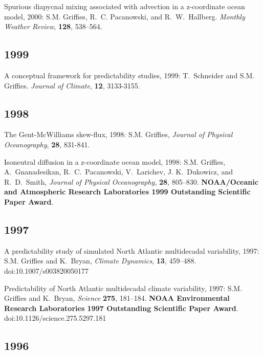 \begin{etaremune}
\item Spurious diapycnal mixing associated with advection in a z-coordinate ocean model, 2000: S.M. Grif\/f\/ies, R.\ C. Pacanowski, and R.\ W.\ Hallberg. {\em Monthly Weather Review}, {\bf 128}, 538--564.

\subsection*{\sc \color{Maroon} 1999}

\item A conceptual framework for predictability studies, 1999: T.\  Schneider and S.M. Grif\/f\/ies.  {\em Journal of Climate}, {\bf 12}, 3133-3155.

\subsection*{\sc \color{Maroon} 1998}
  
\item The Gent-McWilliams skew-flux, 1998: S.M. Grif\/f\/ies, {\em Journal of Physical Oceanography}, {\bf 28}, 831-841.
  
\item Isoneutral diffusion in a z-coordinate ocean model, 1998: S.M. Grif\/f\/ies, A.\ Gnanadesikan, R.\ C.\ Pacanowski, V.\ Larichev, J. K.\ Dukowicz, and R.\ D.\ Smith, {\em Journal of  Physical Oceanography}, {\bf 28}, 805--830.  {\bf NOAA/Oceanic and Atmospheric Research Laboratories 1999 Outstanding Scientific Paper Award}.

\subsection*{\sc \color{Maroon} 1997}
  
\item A predictability study of simulated North Atlantic multidecadal variability, 1997: S.M. Grif\/f\/ies and K.\ Bryan, {\em Climate Dynamics}, {\bf 13}, 459--488. doi:10.1007/s003820050177
  
\item Predictability of North Atlantic multidecadal climate variability, 1997: S.M. Grif\/f\/ies and K.\ Bryan, {\em Science} {\bf 275}, 181--184. {\bf NOAA Environmental Research Laboratories 1997 Outstanding Scientific Paper Award}.
doi:10.1126/science.275.5297.181

\subsection*{\sc \color{Maroon} 1996}
 

\end{etaremune}
